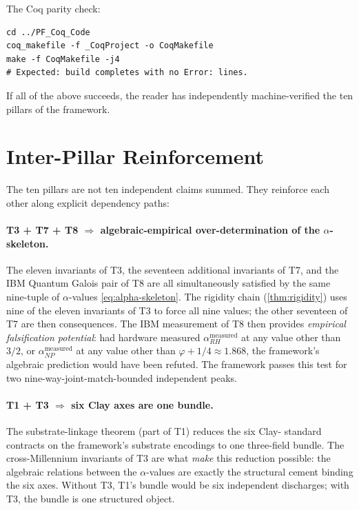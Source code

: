 \documentclass[11pt,a4paper]{article}
\theoremstyle{definition}
\begin{document}
The Coq parity check:
\begin{verbatim}
cd ../PF_Coq_Code
coq_makefile -f _CoqProject -o CoqMakefile
make -f CoqMakefile -j4
# Expected: build completes with no Error: lines.
\end{verbatim}

If all of the above succeeds, the reader has independently
machine-verified the ten pillars of the framework.

\section{Inter-Pillar Reinforcement}
\label{sec:reinforcement}

The ten pillars are not ten independent claims summed. They
reinforce each other along explicit dependency paths:

\paragraph{T3 + T7 + T8 \(\Rightarrow\) algebraic-empirical
over-determination of the $\alpha$-skeleton.} The eleven invariants
of T3, the seventeen additional invariants of T7, and the IBM
Quantum Galois pair of T8 are all simultaneously satisfied by the
same nine-tuple of $\alpha$-values \eqref{eq:alpha-skeleton}. The
rigidity chain (\cref{thm:rigidity}) uses nine of the eleven
invariants of T3 to force all nine values; the other seventeen of
T7 are then consequences. The IBM measurement of T8 then provides
\emph{empirical falsification potential}: had hardware measured
$\alpha_{RH}^{\text{measured}}$ at any value other than $3/2$, or
$\alpha_{NP}^{\text{measured}}$ at any value other than
$\varphi + 1/4 \approx 1.868$, the framework's algebraic prediction
would have been refuted. The framework passes this test for two
nine-way-joint-match-bounded independent peaks.

\paragraph{T1 + T3 \(\Rightarrow\) six Clay axes are one bundle.}
The substrate-linkage theorem (part of T1) reduces the six Clay-
standard contracts on the framework's substrate encodings to one
three-field bundle. The cross-Millennium invariants of T3 are what
\emph{make} this reduction possible: the algebraic relations between
the $\alpha$-values are exactly the structural cement binding the
six axes. Without T3, T1's bundle would be six independent
discharges; with T3, the bundle is one structured object.
\end{document}
